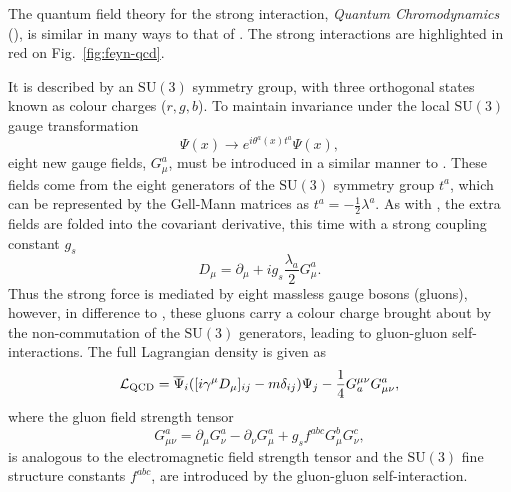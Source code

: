 The quantum field theory for the strong interaction, \textit{Quantum Chromodynamics} (\QCD{}), is similar in many ways to that of \QED{}.
The strong interactions are highlighted in red on Fig.~\ref{fig:feyn-qcd}.

It is described by an $\mathrm{SU(3)}$ symmetry group, with three orthogonal states known as colour charges ($r,g,b$).
To maintain invariance under the local $\mathrm{SU(3)}$ gauge transformation
\begin{equation}
\Psi(x) \to e^{i\theta^{a}(x)t^{a}}\Psi(x),
\end{equation}
eight new gauge fields, $G_{\mu}^{a}$, must be introduced in a similar manner to \QED{}.
These fields come from the eight generators of the $\mathrm{SU(3)}$ symmetry group $t^{a}$, which can be represented by the Gell-Mann matrices as $t^{a}=-\frac{1}{2}\lambda^{a}$.
As with \QED{}, the extra fields are folded into the covariant derivative, this time with a strong coupling constant $g_{s}$
\begin{equation}
D_{\mu} = \partial_{\mu}+ig_{s}\frac{\lambda_{a}}{2}G_{\mu}^{a}.
\end{equation}
Thus the strong force is mediated by eight massless gauge bosons (gluons), however, in difference to \QED{}, these gluons carry a colour charge brought about by the non-commutation of the $\mathrm{SU(3)}$ generators, leading to gluon-gluon self-interactions.
The full \QCD{} Lagrangian density is given as
\begin{equation}
\mathcal{L}_{\mathrm{QCD}}=\overline{\Psi}_{i}([i\gamma^{\mu}D_{\mu}]_{ij}-m\delta_{ij})\Psi_{j} - \frac{1}{4}G^{\mu \nu}_{a}G^{a}_{\mu \nu},
\end{equation}
where the gluon field strength tensor 
\begin{equation}
	G_{\mu \nu}^{a}=\partial_{\mu}G_{\nu}^{a} - \partial_{\nu}G_{\mu}^{a} + g_{s}f^{abc}G_{\mu}^{b}G_{\nu }^{c},
\end{equation}
is analogous to the electromagnetic field strength tensor and the $\mathrm{SU(3)}$ fine structure constants $f^{abc}$, are introduced by the gluon-gluon self-interaction.

